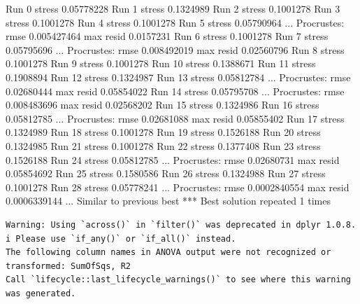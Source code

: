 \documentclass[
]{book}
\newenvironment{Shaded}{\begin{snugshade}}{\end{snugshade}}
\newcommand{\NormalTok}[1]{#1}
\begin{document}
\begin{Shaded}
\begin{Highlighting}[]
\NormalTok{Run 0 stress 0.05778228 }
\NormalTok{Run 1 stress 0.1324989 }
\NormalTok{Run 2 stress 0.1001278 }
\NormalTok{Run 3 stress 0.1001278 }
\NormalTok{Run 4 stress 0.1001278 }
\NormalTok{Run 5 stress 0.05790964 }
\NormalTok{... Procrustes: rmse 0.005427464  max resid 0.0157231 }
\NormalTok{Run 6 stress 0.1001278 }
\NormalTok{Run 7 stress 0.05795696 }
\NormalTok{... Procrustes: rmse 0.008492019  max resid 0.02560796 }
\NormalTok{Run 8 stress 0.1001278 }
\NormalTok{Run 9 stress 0.1001278 }
\NormalTok{Run 10 stress 0.1388671 }
\NormalTok{Run 11 stress 0.1908894 }
\NormalTok{Run 12 stress 0.1324987 }
\NormalTok{Run 13 stress 0.05812784 }
\NormalTok{... Procrustes: rmse 0.02680444  max resid 0.05854022 }
\NormalTok{Run 14 stress 0.05795708 }
\NormalTok{... Procrustes: rmse 0.008483696  max resid 0.02568202 }
\NormalTok{Run 15 stress 0.1324986 }
\NormalTok{Run 16 stress 0.05812785 }
\NormalTok{... Procrustes: rmse 0.02681088  max resid 0.05855402 }
\NormalTok{Run 17 stress 0.1324989 }
\NormalTok{Run 18 stress 0.1001278 }
\NormalTok{Run 19 stress 0.1526188 }
\NormalTok{Run 20 stress 0.1324985 }
\NormalTok{Run 21 stress 0.1001278 }
\NormalTok{Run 22 stress 0.1377408 }
\NormalTok{Run 23 stress 0.1526188 }
\NormalTok{Run 24 stress 0.05812785 }
\NormalTok{... Procrustes: rmse 0.02680731  max resid 0.05854692 }
\NormalTok{Run 25 stress 0.1580586 }
\NormalTok{Run 26 stress 0.1324988 }
\NormalTok{Run 27 stress 0.1001278 }
\NormalTok{Run 28 stress 0.05778241 }
\NormalTok{... Procrustes: rmse 0.0002840554  max resid 0.0006339144 }
\NormalTok{... Similar to previous best}
\NormalTok{*** Best solution repeated 1 times}
\end{Highlighting}
\end{Shaded}

\begin{verbatim}
Warning: Using `across()` in `filter()` was deprecated in dplyr 1.0.8.
i Please use `if_any()` or `if_all()` instead.
The following column names in ANOVA output were not recognized or transformed: SumOfSqs, R2
Call `lifecycle::last_lifecycle_warnings()` to see where this warning was generated.
\end{verbatim}
\end{document}
